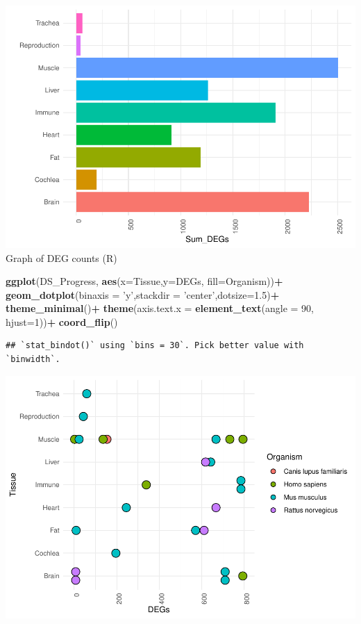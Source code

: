 \documentclass[
]{article}
\newenvironment{Shaded}{\begin{snugshade}}{\end{snugshade}}
\newcommand{\DataTypeTok}[1]{\textcolor[rgb]{0.13,0.29,0.53}{#1}}
\newcommand{\DecValTok}[1]{\textcolor[rgb]{0.00,0.00,0.81}{#1}}
\newcommand{\FloatTok}[1]{\textcolor[rgb]{0.00,0.00,0.81}{#1}}
\newcommand{\KeywordTok}[1]{\textcolor[rgb]{0.13,0.29,0.53}{\textbf{#1}}}
\newcommand{\NormalTok}[1]{#1}
\newcommand{\OperatorTok}[1]{\textcolor[rgb]{0.81,0.36,0.00}{\textbf{#1}}}
\newcommand{\StringTok}[1]{\textcolor[rgb]{0.31,0.60,0.02}{#1}}
\begin{document}
\includegraphics{Thesis_DualCodeTest_files/figure-latex/unnamed-chunk-39-1.pdf}
Graph of DEG counts (R)

\begin{Shaded}
\begin{Highlighting}[]
\KeywordTok{ggplot}\NormalTok{(DS_Progress, }\KeywordTok{aes}\NormalTok{(}\DataTypeTok{x=}\NormalTok{Tissue,}\DataTypeTok{y=}\NormalTok{DEGs, }\DataTypeTok{fill=}\NormalTok{Organism))}\OperatorTok{+}
\StringTok{  }\KeywordTok{geom_dotplot}\NormalTok{(}\DataTypeTok{binaxis =} \StringTok{'y'}\NormalTok{,}\DataTypeTok{stackdir =} \StringTok{'center'}\NormalTok{,}\DataTypeTok{dotsize=}\FloatTok{1.5}\NormalTok{)}\OperatorTok{+}
\StringTok{  }\KeywordTok{theme_minimal}\NormalTok{()}\OperatorTok{+}
\StringTok{  }\KeywordTok{theme}\NormalTok{(}\DataTypeTok{axis.text.x =} \KeywordTok{element_text}\NormalTok{(}\DataTypeTok{angle =} \DecValTok{90}\NormalTok{, }\DataTypeTok{hjust=}\DecValTok{1}\NormalTok{))}\OperatorTok{+}
\StringTok{  }\KeywordTok{coord_flip}\NormalTok{()}
\end{Highlighting}
\end{Shaded}

\begin{verbatim}
## `stat_bindot()` using `bins = 30`. Pick better value with `binwidth`.
\end{verbatim}

\includegraphics{Thesis_DualCodeTest_files/figure-latex/unnamed-chunk-40-1.pdf}
\end{document}
